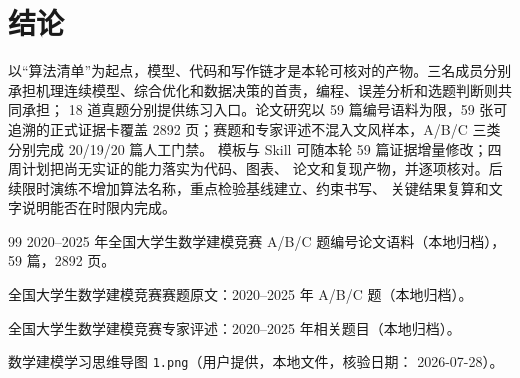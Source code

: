 \section{结论}

以“算法清单”为起点，模型、代码和写作链才是本轮可核对的产物。三名成员分别
承担机理连续模型、综合优化和数据决策的首责，编程、误差分析和选题判断则共同承担；
18 道真题分别提供练习入口。论文研究以 59 篇编号语料为限，59 张可追溯的正式证据卡覆盖
2892 页；赛题和专家评述不混入文风样本，A/B/C 三类分别完成 20/19/20 篇人工门禁。
模板与 Skill 可随本轮 59 篇证据增量修改；四周计划把尚无实证的能力落实为代码、图表、
论文和复现产物，并逐项核对。后续限时演练不增加算法名称，重点检验基线建立、约束书写、
关键结果复算和文字说明能否在时限内完成。

\begin{thebibliography}{99}
2020--2025 年全国大学生数学建模竞赛 A/B/C 题编号论文语料（本地归档），
59 篇，2892 页。

全国大学生数学建模竞赛赛题原文：2020--2025 年 A/B/C 题（本地归档）。

全国大学生数学建模竞赛专家评述：2020--2025 年相关题目（本地归档）。

数学建模学习思维导图 \texttt{1.png}（用户提供，本地文件，核验日期：
2026-07-28）。
\end{thebibliography}

\appendix
